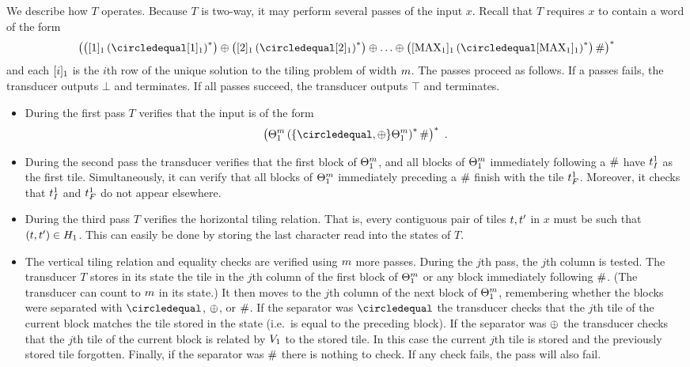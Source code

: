 We describe how $T$ operates.
Because $T$ is two-way, it may perform several passes of the input $x$.
Recall that $T$ requires $x$ to contain a word of the form
\[
    \brac{
        \brac{\tenc{1}{1} \brac{\numeq \tenc{1}{1}}^\ast}
        \numplus
        \brac{\tenc{1}{2} \brac{\numeq \tenc{1}{2}}^\ast}
        \numplus
        \ldots
        \numplus
        \brac{
            \tenc{1}{\nmax{1}}
                \brac{\numeq \tenc{1}{\nmax{1}}}^\ast
        }
        \numsep
    }^\ast
\]
and each $\tenc{1}{i}$ is the $i$th row of the unique solution to the tiling problem of width $\linlen$.
The passes proceed as follows.
If a passes fails, the transducer outputs $\bot$ and terminates.
If all passes succeed, the transducer outputs $\top$ and terminates.
\begin{itemize}
\item
    During the first pass $T$ verifies that the input is of the form
    \[
        \brac{
            \tilesnum{1}^\linlen
            \brac{\set{\numeq,\numplus} \tilesnum{1}^\linlen}^\ast
            \numsep
        }^\ast \ .
    \]

\item
    During the second pass the transducer verifies that the first block of
    $\tilesnum{1}^\linlen$,
    and all blocks of
    $\tilesnum{1}^\linlen$
    immediately following a $\numsep$ have $\inittilenum{1}$ as the first tile.
    Simultaneously, it can verify that all blocks of
    $\tilesnum{1}^\linlen$
    immediately preceding a $\numsep$ finish with the tile $\fintilenum{1}$.
    Moreover, it checks that $\inittilenum{1}$ and $\fintilenum{1}$ do not appear elsewhere.

\item
    During the third pass $T$ verifies the horizontal tiling relation.
    That is, every contiguous pair of tiles $\tile, \tile'$ in $x$ must be such that
    $(\tile, \tile') \in \hrelnum{1}$.
    This can easily be done by storing the last character read into the states of $T$.

\item
    The vertical tiling relation and equality checks are verified using $\linlen$ more passes.
    During the $j$th pass, the $j$th column is tested.
    The transducer $T$ stores in its state the tile in the $j$th column of the first block of $\tilesnum{1}^\linlen$ or any block immediately following $\numsep$.
    (The transducer can count to $\linlen$ in its state.)
    It then moves to the $j$th column of the next block of $\tilesnum{1}^\linlen$, remembering whether the blocks were separated with $\numeq$, $\numplus$, or $\numsep$.
    If the separator was $\numeq$ the transducer checks that the $j$th tile of the current block matches the tile stored in the state (i.e.~is equal to the preceding block).
    If the separator was $\numplus$ the transducer checks that the $j$th tile of the current block is related by $\vrelnum{1}$ to the stored tile.
    In this case the current $j$th tile is stored and the previously stored tile forgotten.
    Finally, if the separator was $\numsep$ there is nothing to check.
    If any check fails, the pass will also fail.
\end{itemize}

